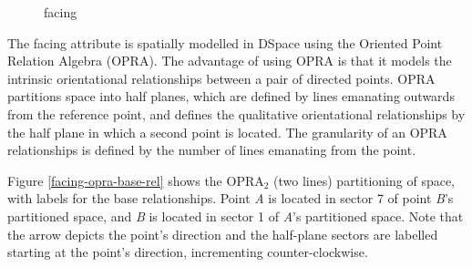 \documentclass[12pt]{ucthesis}
\begin{document}
\begin{figure}[H]
 \centering
 \hspace{10 mm}
  \hspace{10 mm}
 \hspace{10 mm}
 \caption{facing}
\label{display-arrangement}
\end{figure}

The facing attribute is spatially modelled in DSpace using the Oriented Point Relation Algebra \cite{Moratz} (OPRA). The advantage of using OPRA is that it models the intrinsic orientational relationships between a pair of directed points. OPRA partitions space into half planes, which are defined by lines emanating outwards from the reference point, and defines the qualitative orientational relationships by the half plane in which a second point is located. The granularity of an OPRA relationships is defined by the number of lines emanating from the point. 

Figure \ref{facing-opra-base-rel} shows the OPRA$_{2}$ (two lines) partitioning of space, with labels for the base relationships. Point \emph{A} is located in sector 7 of point \emph{B}'s partitioned space, and \emph{B} is located in sector 1 of \emph{A}'s partitioned space. Note that the arrow depicts the point's direction and the half-plane sectors are labelled starting at the point's direction, incrementing counter-clockwise. 
\end{document}
